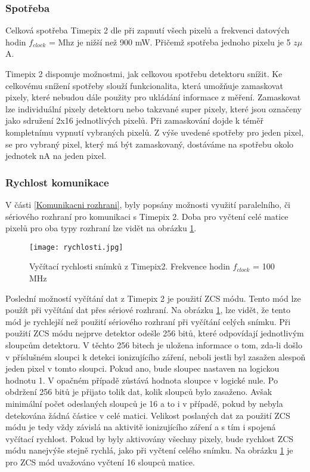 \subsubsection{Spotřeba}	
Celková spotřeba Timepix 2 dle \cite{Timepix2} při zapnutí všech pixelů a frekvenci datových hodin $f_{clock}$ = Mhz je nižší než 900 mW. Přičemž spotřeba jednoho pixelu je 5 $z\mu$A.
\par Timepix 2 disponuje možnostmi, jak celkovou spotřebu detektoru snížit. Ke celkovému snížení spotřeby slouží funkcionalita, která umožňuje zamaskovat pixely, které nebudou dále použity pro ukládání informace z měření. Zamaskovat lze individuální pixely detektoru nebo takzvané super pixely, které jsou označeny jako sdružení 2x16 jednotlivých pixelů. Při zamaskování dojde k téměř kompletnímu vypnutí vybraných pixelů. Z výše uvedené spotřeby pro jeden pixel, se pro vybraný pixel, který má být zamaskovaný, dostáváme na spotřebu okolo jednotek nA na jeden pixel.

\subsubsection{Rychlost komunikace}
V části \ref{Komunikacni rozhrani}, byly popsány možnosti využití paralelního, či sériového rozhraní pro komunikaci s Timepix 2. Doba pro vyčtení celé matice pixelů pro oba typy rozhraní lze vidět na obrázku \ref{fig:rychlosti}. 
\begin{figure}[h!]
	\centering
	\captionsetup{justification=centering}
	\texttt{[image: rychlosti.jpg]}
	\caption{Vyčítací rychlosti snímků z Timepix2. Frekvence hodin $f_{clock}$ = 100 MHz \cite{Timepix2}} 
	\label{fig:rychlosti}
\end{figure}	

Poslední možností vyčítání dat z Timepix 2 je použití ZCS módu. Tento mód lze použít při vyčítání dat přes sériové rozhraní. Na obrázku \ref{fig:rychlosti}, lze vidět, že tento mód je rychlejší než použití sériového rozhraní při vyčítání celých snímku. Při použití ZCS módu nejprve detektor odešle 256 bitů, které odpovídají jednotlivým sloupcům detektoru. V těchto 256 bitech je uložena informace o tom, zda-li došlo v příslušném sloupci k detekci ionizujícího záření, neboli jestli byl zasažen alespoň jeden pixel v tomto sloupci. Pokud ano, bude sloupec nastaven na logickou hodnotu 1. V opačném případě zůstává hodnota sloupce v logické nule. Po obdržení 256 bitů je přijato tolik dat, kolik sloupců bylo zasaženo. Avšak minimální počet odeslaných sloupců je 16 a to i v případě, pokud by nebyla detekována žádná částice v celé matici. Velikost poslaných dat za použití ZCS módu je tedy vždy závislá na aktivitě ionizujícího záření a s tím i spojená vyčítací rychlost. Pokud by byly aktivovány všechny pixely, bude rychlost ZCS módu nanejvýše stejně rychlá, jako při vyčtení celého snímku. Na obrázku \ref{fig:rychlosti} je pro ZCS mód uvažováno vyčtení 16 sloupců matice.


